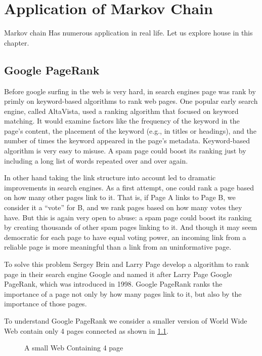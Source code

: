 \chapter{Application of Markov Chain}
Markov chain Has  numerous application in real life. Let us explore house in this chapter.

\section{Google PageRank}
Before google surfing in the web is very hard, in search engines page was rank by primly on keyword-based algorithms to rank web pages. 
One popular early search engine, called AltaVista, used a ranking algorithm that focused on keyword matching. 
It would examine factors like the frequency of the keyword in the page's content, 
the placement of the keyword (e.g., in titles or headings), and the number of times the keyword appeared in the page's metadata.
Keyword-based algorithm is very easy to misuse. A spam page could boost its ranking
just by including a long list of words repeated over and over again.

In other hand taking the link structure into account led to dramatic improvements
in search engines. As a first attempt, one could rank a page based on how many
other pages link to it. That is, if Page A links to Page B, we consider it a “vote”
for B, and we rank pages based on how many votes they have.
But this is again very open to abuse: a spam page could boost its ranking by creating
thousands of other spam pages linking to it.
And though it may seem democratic
for each page to have equal voting power, an incoming link from a reliable page is
more meaningful than a link from an uninformative page.

To solve this problem Sergey Brin and Larry Page develop a algorithm to rank page
in their search engine Google and named it after Larry Page Google PageRank, 
which was introduced in 1998. Google PageRank ranks
the importance of a page not only by how many pages link to it, but also by the
importance of those pages.

To understand Google PageRank we consider a smaller version of World Wide Web 
contain only 4 pages connected as shown in \cref{A small Web Containing 4 page}.

\begin{figure}[H]
    \centering
    \caption{A small Web Containing 4 page}
    \label{A small Web Containing 4 page}
\end{figure}

